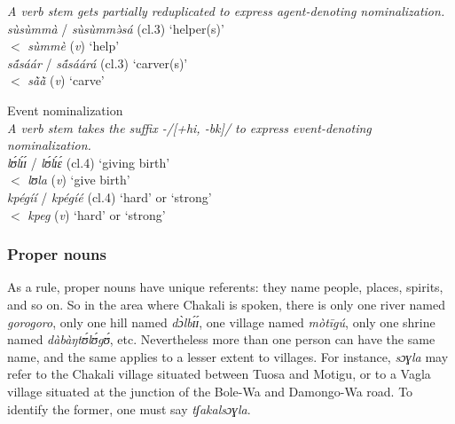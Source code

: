 \begin{exe}
\begin{exe}
\begin{exe}
{\begin{exe}
\begin{exe}
\begin{exe}
\begin{exe}
\begin{exe}
 \ex\label{exːGRM-der-agent-redup}
{\it A verb stem gets partially reduplicated   to express
agent-denoting nominalization.} \\
{\it  sùsùmmà} / {\it sùsùmmə̀sá} ({\sc cl.3})  `helper(s)' \\
$<$ {\it sùmmè} ({\it v}) `help' \\
{\it  sã́sáár} / {\it sã́sáárá} ({\sc cl.3})  `carver(s)' \\
$<$ {\it sã̀ã̀} ({\it v}) `carve' 


\z 
 \z


\begin{exe}
 \ex\label{exːGRM-der-action}{\rm Event nominalization}\\
{\it A verb stem takes the suffix -/[{\sc +hi, -bk}]/   to express
event-denoting
nominalization.} \\
{\it lʊ́lɪ́ɪ́ } / {\it  lʊ́lɪ́ɛ́} ({\sc cl.4}) `giving birth'  \\
 $<$ {\it  lʊla} ({\it v}) `give birth'\\
{\it kpégíí} / {\it   kpégíé}  ({\sc cl.4})  `hard'  or
`strong' \\
 $<$ {\it  kpeg} ({\it v}) `hard' or `strong'\\

\z

\subsubsection{Proper nouns}
\label{sec:GRM-prop-noun}

% 


As a rule,   proper nouns
have  unique referents:  they  name people, places, spirits, and so on.  So in
the
area where Chakali is spoken, there is only one river named {\it gorogoro}, only
one hill named {\it dɔ̀lbɪ́ɪ́}, one
village
named {\it mòtīgú},  only one shrine named {\it dàbàŋtʊ́lʊ́gʊ́}, etc.  
Nevertheless more than one person can have the same
name, and the same applies to a lesser extent to villages. For instance,
{\it sɔɣla} may refer to the Chakali village situated between Tuosa and Motigu, 
or to
a Vagla village situated at the junction of the Bole-Wa and Damongo-Wa road. To
identify the former, one must say {\it tʃakalsɔɣla}. 



\end{exe}
\end{exe}
\end{exe}
\end{exe}
\end{exe}
\end{exe}}
\end{exe}
\end{exe}
\end{exe}
